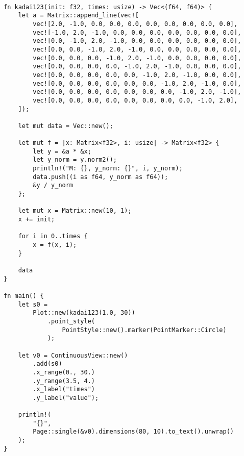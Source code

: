 \documentclass[uplatex, 11pt,a4j, titlepage]{jsarticle}
\begin{document}
\begin{lstlisting}[caption={main.rs}]

fn kadai123(init: f32, times: usize) -> Vec<(f64, f64)> {
    let a = Matrix::append_line(vec![
        vec![2.0, -1.0, 0.0, 0.0, 0.0, 0.0, 0.0, 0.0, 0.0, 0.0],
        vec![-1.0, 2.0, -1.0, 0.0, 0.0, 0.0, 0.0, 0.0, 0.0, 0.0],
        vec![0.0, -1.0, 2.0, -1.0, 0.0, 0.0, 0.0, 0.0, 0.0, 0.0],
        vec![0.0, 0.0, -1.0, 2.0, -1.0, 0.0, 0.0, 0.0, 0.0, 0.0],
        vec![0.0, 0.0, 0.0, -1.0, 2.0, -1.0, 0.0, 0.0, 0.0, 0.0],
        vec![0.0, 0.0, 0.0, 0.0, -1.0, 2.0, -1.0, 0.0, 0.0, 0.0],
        vec![0.0, 0.0, 0.0, 0.0, 0.0, -1.0, 2.0, -1.0, 0.0, 0.0],
        vec![0.0, 0.0, 0.0, 0.0, 0.0, 0.0, -1.0, 2.0, -1.0, 0.0],
        vec![0.0, 0.0, 0.0, 0.0, 0.0, 0.0, 0.0, -1.0, 2.0, -1.0],
        vec![0.0, 0.0, 0.0, 0.0, 0.0, 0.0, 0.0, 0.0, -1.0, 2.0],
    ]);
    
    let mut data = Vec::new();
    
    let mut f = |x: Matrix<f32>, i: usize| -> Matrix<f32> {
        let y = &a * &x;
        let y_norm = y.norm2();
        println!("M: {}, y_norm: {}", i, y_norm);
        data.push((i as f64, y_norm as f64));
        &y / y_norm
    };
    
    let mut x = Matrix::new(10, 1);
    x += init;
    
    for i in 0..times {
        x = f(x, i);
    }
    
    data
}

fn main() {
    let s0 =
        Plot::new(kadai123(1.0, 30))
            .point_style(
                PointStyle::new().marker(PointMarker::Circle)
            );

    let v0 = ContinuousView::new()
        .add(s0)
        .x_range(0., 30.)
        .y_range(3.5, 4.)
        .x_label("times")
        .y_label("value");

    println!(
        "{}",
        Page::single(&v0).dimensions(80, 10).to_text().unwrap()
    );
}
\end{lstlisting}
\end{document}
